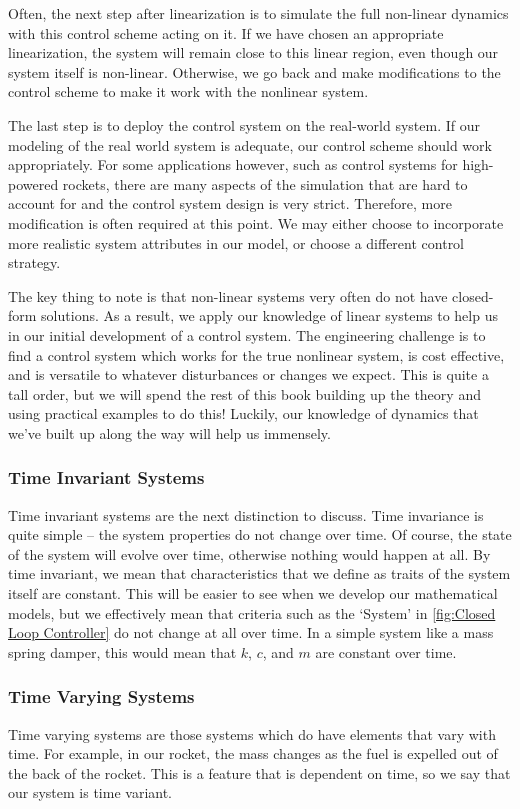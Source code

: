 Often, the next step after linearization is to simulate the full non-linear dynamics with this control scheme acting on it. If we have chosen an appropriate linearization, the system will remain close to this linear region, even though our system itself is non-linear. Otherwise, we go back and make modifications to the control scheme to make it work with the nonlinear system.

The last step is to deploy the control system on the real-world system. If our modeling of the real world system is adequate, our control scheme should work appropriately. For some applications however, such as control systems for high-powered rockets, there are many aspects of the simulation that are hard to account for and the control system design is very strict. Therefore, more modification is often required at this point. We may either choose to incorporate more realistic system attributes in our model, or choose a different control strategy.

The key thing to note is that non-linear systems very often do not have closed-form solutions. As a result, we apply our knowledge of linear systems to help us in our initial development of a control system. The engineering challenge is to find a control system which works for the true nonlinear system, is cost effective, and is versatile to whatever disturbances or changes we expect. This is quite a tall order, but we will spend the rest of this book building up the theory and using practical examples to do this! Luckily, our knowledge of dynamics that we've built up along the way will help us immensely.

\subsubsection{Time Invariant Systems}
Time invariant systems are the next distinction to discuss. Time invariance is quite simple -- the system properties do not change over time. Of course, the state of the system will evolve over time, otherwise nothing would happen at all. By time invariant, we mean that characteristics that we define as traits of the system itself are constant. This will be easier to see when we develop our mathematical models, but we effectively mean that criteria such as the `System' in \autoref{fig:Closed Loop Controller} do not change at all over time. In a simple system like a mass spring damper, this would mean that $k$, $c$, and $m$ are constant over time.

\subsubsection{Time Varying Systems}
Time varying systems are those systems which do have elements that vary with time. For example, in our rocket, the mass changes as the fuel is expelled out of the back of the rocket. This is a feature that is dependent on time, so we say that our system is time variant.

